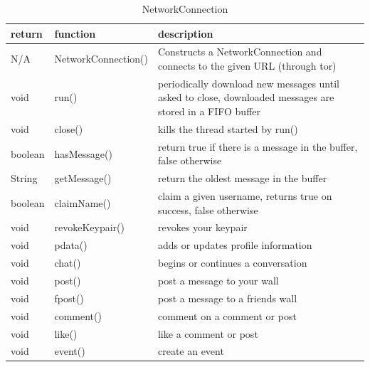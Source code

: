 \begin{table}[h]
    \centering
    \begin{tabular}{p{1cm}p{2.8cm}p{9cm}}
    return   & function            & description\\ \hline
    N/A      & NetworkConnection() & Constructs a NetworkConnection and connects to the given URL (through tor)\\
    void     & run()               & periodically download new messages until asked to close, downloaded messages are stored in a FIFO buffer\\
    void     & close()             & kills the thread started by run()\\
    boolean  & hasMessage()        & return true if there is a message in the buffer, false otherwise\\
    String   & getMessage()        & return the oldest message in the buffer\\
    
    boolean  & claimName()     & claim a given username, returns true on success, false otherwise\\
    void     & revokeKeypair() & revokes your keypair\\
    void     & pdata()         & adds or updates profile information\\
    void     & chat()          & begins or continues a conversation\\
    void     & post()          & post a message to your wall\\
    void     & fpost()         & post a message to a friends wall\\
    void     & comment()       & comment on a comment or post\\
    void     & like()          & like a comment or post\\
    void     & event()         & create an event\\
    \end{tabular}
    \caption{NetworkConnection}
\end{table}


